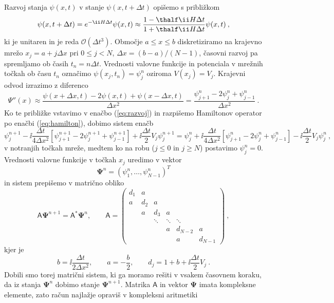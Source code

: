 \documentclass{article}
\begin{document}
Razvoj stanja $\psi(x,t)$ v stanje $\psi(x,t+\Delta t)$ opišemo s približkom
\begin{equation}
  \psi(x,t+\Delta t)=e^{-\ii H \Delta t} \psi(x,t)\approx \frac{1-\thalf \ii H \Delta t}{1+\thalf \ii H \Delta t}\psi(x,t)\>,
  \label{eq:razvoj}
\end{equation}
ki je unitaren in je reda $\mathcal{O}(\Delta t^3)$. Območje $a\leq x\leq b$ diskretiziramo na krajevno mrežo $x_j=a+j\Delta x$ pri $0\leq j<N$, $\Delta x = (b-a)/(N-1)$, časovni razvoj pa spremljamo ob časih $t_n=n\Delta t$. Vrednosti valovne funkcije in potenciala v mrežnih točkah ob času $t_n$ označimo $\psi(x_j,t_n)=\psi_j^n$ oziroma $V(x_j)=V_j$. Krajevni odvod izrazimo z diferenco
\begin{equation*}
  \Psi''(x)\approx \frac{\psi(x+\Delta x,t)-2\psi(x,t)+\psi(x-\Delta x,t)}{\Delta x^2}=\frac{\psi_{j+1}^n - 2\psi_j^n+\psi_{j-1}^n}{\Delta x^2}\>.
\end{equation*}
Ko te približke vstavimo v enačbo (\ref{eq:razvoj}) in razpišemo Hamiltonov operator po enačbi (\ref{eq:hamilton}), dobimo sistem enačb
\begin{equation*}
  \psi_j^{n+1}-\ii\frac{\Delta t}{4\Delta x^2}\left[\psi_{j+1}^{n+1}-2\psi_j^{n+1}+\psi_{j-1}^{n+1}\right] + \ii\frac{\Delta t}{2}V_j \psi_j^{n+1}=  \psi_j^{n}+\ii\frac{\Delta t}{4\Delta x^2}\left[\psi_{j+1}^{n}-2\psi_j^{n}+\psi_{j-1}^{n}\right] - \ii\frac{\Delta t}{2}V_j \psi_j^{n}\>,
\end{equation*}
v notranjih točkah mreže, medtem ko na robu ($j\leq 0$ in $j\geq N$) postavimo $\psi_j^n=0$. Vrednosti valovne funkcije v točkah $x_j$ uredimo v vektor
\begin{equation*}
\boldsymbol{\Psi}^n=(\psi_1^n,\ldots,\psi_{N-1}^n)^T
\end{equation*}
in sistem prepišemo v matrično obliko
\begin{equation*}
  \mathsf{A}\boldsymbol{\Psi}^{n+1}=\mathsf{A}^\ast \boldsymbol{\Psi}^n,\qquad
  \mathsf{A}=\begin{pmatrix}
  d_1 & a \\
  a   & d_2 & a \\
  & a & d_3 & a \\
  & & \ddots & \ddots & \ddots \\
  & & & a & d_{N-2} & a \\
  & & & & a & d_{N-1}
  \end{pmatrix}\>,
\end{equation*}
kjer je
\begin{equation*}
  b=\ii \frac{\Delta t}{2 \Delta x^2},\qquad a=-\frac{b}{2},\qquad d_j = 1+b+\ii \frac{\Delta t}{2}V_j\>.
\end{equation*}
Dobili smo torej matrični sistem, ki ga moramo rešiti v vsakem časovnem koraku, da iz stanja $\boldsymbol{\Psi}^n$ dobimo stanje $\boldsymbol{\Psi}^{n+1}$. Matrika $\mathsf{A}$ in vektor $\boldsymbol{\Psi}$ imata kompleksne elemente, zato račun najlažje opraviš v kompleksni aritmetiki
\newpage
\end{document}
